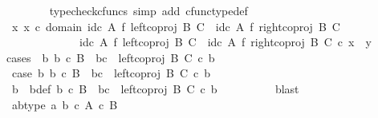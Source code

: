 \begin{isabellebody}
\ \ \ \ \ \ \isamarkupfalse%
\ {\isacharparenleft}{\kern0pt}typecheck{\isacharunderscore}{\kern0pt}cfuncs{\isacharcomma}{\kern0pt}\ simp\ add{\isacharcolon}{\kern0pt}\ cfunc{\isacharunderscore}{\kern0pt}type{\isacharunderscore}{\kern0pt}def{\isacharparenright}{\kern0pt}\isanewline
\ \ \ \ \isamarkupfalse%
\ {\isachardoublequoteopen}{\isasymexists}x{\isachardot}{\kern0pt}\ x\ {\isasymin}\isactrlsub c\ domain\ {\isacharparenleft}{\kern0pt}{\isacharparenleft}{\kern0pt}id\isactrlsub c\ A\ {\isasymtimes}\isactrlsub f\ left{\isacharunderscore}{\kern0pt}coproj\ B\ C{\isacharparenright}{\kern0pt}\ {\isasymamalg}\ {\isacharparenleft}{\kern0pt}id\isactrlsub c\ A\ {\isasymtimes}\isactrlsub f\ right{\isacharunderscore}{\kern0pt}coproj\ B\ C{\isacharparenright}{\kern0pt}{\isacharparenright}{\kern0pt}\ {\isasymand}\isanewline
\ \ \ \ \ \ \ \ \ \ \ \ \ {\isacharparenleft}{\kern0pt}id\isactrlsub c\ A\ {\isasymtimes}\isactrlsub f\ left{\isacharunderscore}{\kern0pt}coproj\ B\ C{\isacharparenright}{\kern0pt}\ {\isasymamalg}\ {\isacharparenleft}{\kern0pt}id\isactrlsub c\ A\ {\isasymtimes}\isactrlsub f\ right{\isacharunderscore}{\kern0pt}coproj\ B\ C{\isacharparenright}{\kern0pt}\ {\isasymcirc}\isactrlsub c\ x\ {\isacharequal}{\kern0pt}\ y{\isachardoublequoteclose}\isanewline
\ \ \ \ \isamarkupfalse%
{\isacharparenleft}{\kern0pt}cases\ {\isachardoublequoteopen}{\isasymexists}\ b{\isachardot}{\kern0pt}\ b\ {\isasymin}\isactrlsub c\ B\ {\isasymand}\ bc\ {\isacharequal}{\kern0pt}\ left{\isacharunderscore}{\kern0pt}coproj\ B\ C\ {\isasymcirc}\isactrlsub c\ b{\isachardoublequoteclose}{\isacharparenright}{\kern0pt}\isanewline
\ \ \ \ \ \ \isamarkupfalse%
\ case{}{\isacharcolon}{\kern0pt}\ {\isachardoublequoteopen}{\isasymexists}b{\isachardot}{\kern0pt}\ b\ {\isasymin}\isactrlsub c\ B\ {\isasymand}\ bc\ {\isacharequal}{\kern0pt}\ left{\isacharunderscore}{\kern0pt}coproj\ B\ C\ {\isasymcirc}\isactrlsub c\ b{\isachardoublequoteclose}\isanewline
\ \ \ \ \ \ \isamarkupfalse%
\ \isamarkupfalse%
\ b\ \ b{\isacharunderscore}{\kern0pt}def{\isacharcolon}{\kern0pt}\ {\isachardoublequoteopen}b\ {\isasymin}\isactrlsub c\ B\ {\isasymand}\ bc\ {\isacharequal}{\kern0pt}\ left{\isacharunderscore}{\kern0pt}coproj\ B\ C\ {\isasymcirc}\isactrlsub c\ b{\isachardoublequoteclose}\isanewline
\ \ \ \ \ \ \ \ \isamarkupfalse%
\ blast\isanewline
\ \ \ \ \ \ \isamarkupfalse%
\ \isamarkupfalse%
\ ab{\isacharunderscore}{\kern0pt}type{\isacharcolon}{\kern0pt}\ {\isachardoublequoteopen}{\isasymlangle}a{\isacharcomma}{\kern0pt}\ b{\isasymrangle}\ {\isasymin}\isactrlsub c\ {\isacharparenleft}{\kern0pt}A\ {\isasymtimes}\isactrlsub c\ B{\isacharparenright}{\kern0pt}{\isachardoublequoteclose}\isanewline

\end{isabellebody}
